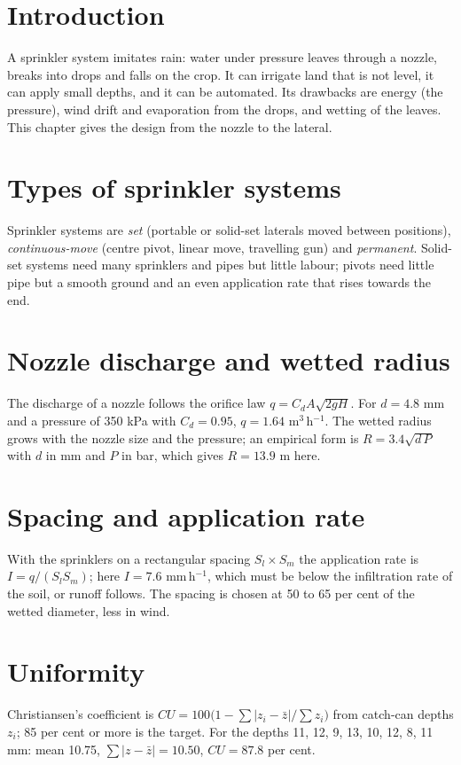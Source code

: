\section{Introduction}
A sprinkler system imitates rain: water under pressure leaves through a nozzle, breaks into drops and falls on the crop. It can irrigate land that is not level, it can apply small depths, and it can be automated. Its drawbacks are energy (the pressure), wind drift and evaporation from the drops, and wetting of the leaves. This chapter gives the design from the nozzle to the lateral.

\section{Types of sprinkler systems}
Sprinkler systems are \emph{set} (portable or solid-set laterals moved between positions), \emph{continuous-move} (centre pivot, linear move, travelling gun) and \emph{permanent}. Solid-set systems need many sprinklers and pipes but little labour; pivots need little pipe but a smooth ground and an even application rate that rises towards the end.

\section{Nozzle discharge and wetted radius}
The discharge of a nozzle follows the orifice law $q=C_dA\sqrt{2gH}$. For $d=4.8$ mm and a pressure of 350 kPa with $C_d=0.95$, $q=1.64$ m$^3$\,h$^{-1}$. The wetted radius grows with the nozzle size and the pressure; an empirical form is $R=3.4\sqrt{d\,P}$ with $d$ in mm and $P$ in bar, which gives $R=13.9$ m here.

\section{Spacing and application rate}
With the sprinklers on a rectangular spacing $S_l\times S_m$ the application rate is $I=q/(S_lS_m)$; here $I=7.6$ mm\,h$^{-1}$, which must be below the infiltration rate of the soil, or runoff follows. The spacing is chosen at 50 to 65 per cent of the wetted diameter, less in wind.

\section{Uniformity}
Christiansen's coefficient is $CU=100\bigl(1-\sum|z_i-\bar z|/\sum z_i\bigr)$ from catch-can depths $z_i$; 85 per cent or more is the target. For the depths 11, 12, 9, 13, 10, 12, 8, 11 mm: mean 10.75, $\sum|z-\bar z|=10.50$, $CU=87.8$ per cent.

